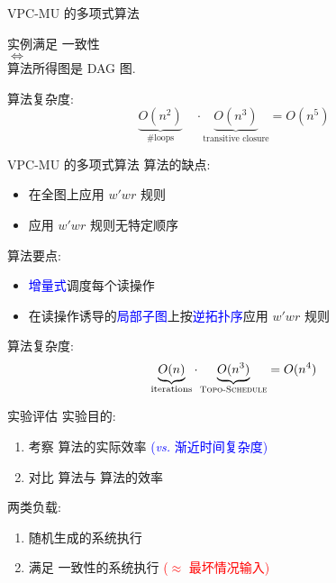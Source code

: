 \begin{frame}{VPC-MU 的多项式算法 \rwclosure{}}
  \begin{ctheorem}
	\begin{center}
	   实例满足 \PRAM{} 一致性\\
		$\iff$\\
	  \rwclosure{} 算法所得图是 DAG 图.
	\end{center}
  \end{ctheorem}

  \pause
  \vspace{0.80cm}

  \rwclosure{} 算法复杂度: 
  \[
    \underbrace{O(n^2)}_{\textrm{\#loops}} \quad\cdot
	\underbrace{O(n^3)}_{\textrm{transitive closure}}  = O(n^5)
  \]
\end{frame}
\begin{frame}{VPC-MU 的多项式算法 \readcentric{}}
  \rwclosure{} 算法的缺点:
  \begin{itemize}
	\item 在全图上应用 $w'wr$ 规则
	\item 应用 $w'wr$ 规则无特定顺序
  \end{itemize}

  \pause
  \vspace{0.50cm}

  \readcentric{} 算法要点:
  \begin{itemize}
	\item \textcolor{blue}{增量式}调度每个读操作
	\item 在读操作诱导的\textcolor{blue}{局部子图}上按\textcolor{blue}{逆拓扑序}应用 $w'wr$ 规则
  \end{itemize}

  \pause
  \vspace{0.60cm}
  \rwclosure{} 算法复杂度: 
  \[
    \underbrace{O(n)}_{\textrm{iterations}} \cdot
	\underbrace{O(n^3)}_{\textsc{Topo-Schedule}} = O(n^4)
  \]
\end{frame}
\begin{frame}{实验评估}
  实验目的:
  \begin{enumerate}
	\item 考察 \readcentric{} 算法的实际效率 
	  \textcolor{blue}{\small ({\it vs.} 渐近时间复杂度)}
	\item 对比 \readcentric{} 算法与 \rwclosure{} 算法的效率
  \end{enumerate}

  \pause
  \vspace{0.50cm}

  两类负载:
  \begin{enumerate}
	\item 随机生成的系统执行
	\item 满足 \PRAM{} 一致性的系统执行 \textcolor{red}{\small ($\approx$ 最坏情况输入)}
  \end{enumerate}
\end{frame}
